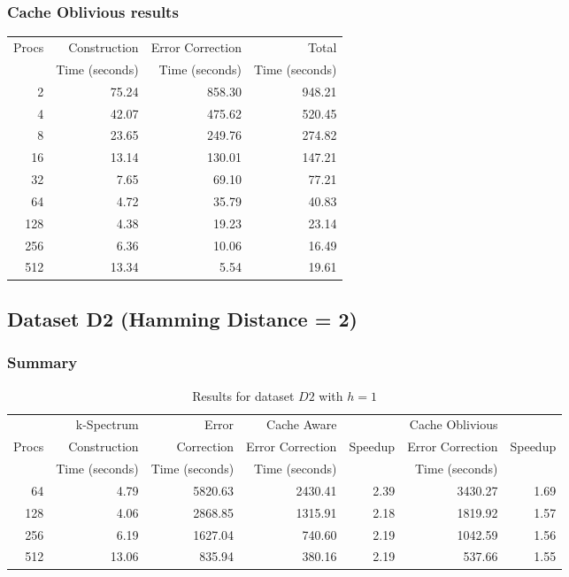 \documentclass[integrals, nointegrals, article, 12pt, a4paper]{article}
\begin{document}
\subsubsection{Cache Oblivious results}
\label{sec-3-2-4}

\begin{center}
\begin{tabular}{rrrr}
\hline
Procs & Construction & Error Correction & Total\\
 & Time (seconds) & Time (seconds) & Time (seconds)\\
\hline
2 & 75.24 & 858.30 & 948.21\\
4 & 42.07 & 475.62 & 520.45\\
8 & 23.65 & 249.76 & 274.82\\
16 & 13.14 & 130.01 & 147.21\\
32 & 7.65 & 69.10 & 77.21\\
64 & 4.72 & 35.79 & 40.83\\
128 & 4.38 & 19.23 & 23.14\\
256 & 6.36 & 10.06 & 16.49\\
512 & 13.34 & 5.54 & 19.61\\
\hline
\end{tabular}
\end{center}
\subsection{Dataset D2 (Hamming Distance = 2)}
\label{sec-3-3}

\subsubsection{Summary}
\label{sec-3-3-1}

\begin{table}[htb]
\caption{\label{tab:d2h1run}Results for dataset $D2$ with $h = 1$}
\centering
\begin{tabular}{rrrrrrr}
\hline
 & k-Spectrum & Error & Cache Aware &  & Cache Oblivious & \\
Procs & Construction & Correction & Error Correction & Speedup & Error Correction & Speedup\\
 & Time (seconds) & Time (seconds) & Time (seconds) &  & Time (seconds) & \\
\hline
64 & 4.79 & 5820.63 & 2430.41 & 2.39 & 3430.27 & 1.69\\
128 & 4.06 & 2868.85 & 1315.91 & 2.18 & 1819.92 & 1.57\\
256 & 6.19 & 1627.04 & 740.60 & 2.19 & 1042.59 & 1.56\\
512 & 13.06 & 835.94 & 380.16 & 2.19 & 537.66 & 1.55\\
\hline
\end{tabular}
\end{table}
\end{document}
